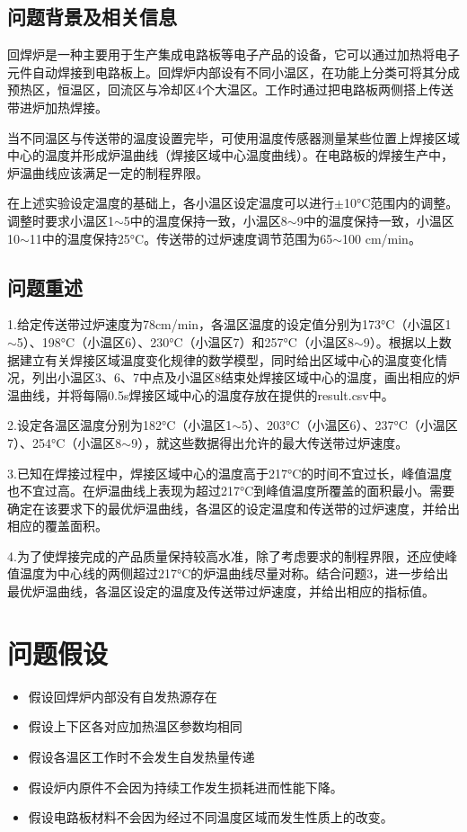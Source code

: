 \documentclass[a4paper,12pt]{ctexart} %
\begin{document}
	\subsection{问题背景及相关信息}
	回焊炉是一种主要用于生产集成电路板等电子产品的设备，它可以通过加热将电子元件自动焊接到电路板上。回焊炉内部设有不同小温区，在功能上分类可将其分成预热区，恒温区，回流区与冷却区4个大温区。工作时通过把电路板两侧搭上传送带进炉加热焊接。\par
	当不同温区与传送带的温度设置完毕，可使用温度传感器测量某些位置上焊接区域中心的温度并形成炉温曲线（焊接区域中心温度曲线）。在电路板的焊接生产中，炉温曲线应该满足一定的制程界限。\par
	在上述实验设定温度的基础上，各小温区设定温度可以进行$\pm$10°C范围内的调整。调整时要求小温区1$\sim$5中的温度保持一致，小温区8$\sim$9中的温度保持一致，小温区10$\sim$11中的温度保持25°C。传送带的过炉速度调节范围为65$\sim$100 cm/min。\par
	\subsection{问题重述}
	1.给定传送带过炉速度为78cm/min，各温区温度的设定值分别为173°C（小温区1$\sim$5）、198°C（小温区6）、230°C（小温区7）和257°C（小温区8$\sim$9）。根据以上数据建立有关焊接区域温度变化规律的数学模型，同时给出区域中心的温度变化情况，列出小温区3、6、7中点及小温区8结束处焊接区域中心的温度，画出相应的炉温曲线，并将每隔0.5s焊接区域中心的温度存放在提供的result.csv中。\par
	2.设定各温区温度分别为182°C（小温区1$\sim$5）、203°C（小温区6）、237°C（小温区7）、254°C（小温区8$\sim$9），就这些数据得出允许的最大传送带过炉速度。\par
	3.已知在焊接过程中，焊接区域中心的温度高于217°C的时间不宜过长，峰值温度也不宜过高。在炉温曲线上表现为超过217°C到峰值温度所覆盖的面积最小。需要确定在该要求下的最优炉温曲线，各温区的设定温度和传送带的过炉速度，并给出相应的覆盖面积。\par
	4.为了使焊接完成的产品质量保持较高水准，除了考虑要求的制程界限，还应使峰值温度为中心线的两侧超过217°C的炉温曲线尽量对称。结合问题3，进一步给出最优炉温曲线，各温区设定的温度及传送带过炉速度，并给出相应的指标值。\par
	\section{问题假设}
	\begin{itemize}
		\item 假设回焊炉内部没有自发热源存在
		\item 假设上下区各对应加热温区参数均相同
		\item 假设各温区工作时不会发生自发热量传递
		\item 假设炉内原件不会因为持续工作发生损耗进而性能下降。
		\item 假设电路板材料不会因为经过不同温度区域而发生性质上的改变。
	\end{itemize}
\end{document}

